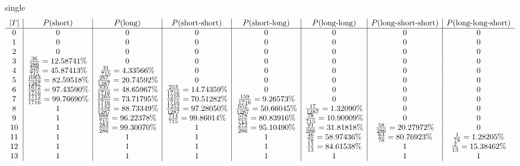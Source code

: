 single
\[
\begin{array}{c| c| c| c| c| c| c| c}
|T| & P(\text{short}) & P(\text{long}) & P(\text{short-short}) & P(\text{short-long}) & P(\text{long-long}) & P(\text{long-short-short}) & P(\text{long-long-short}) \\\hline
0 & 0 & 0 & 0 & 0 & 0 & 0 & 0\\
1 & 0 & 0 & 0 & 0 & 0 & 0 & 0\\
2 & 0 & 0 & 0 & 0 & 0 & 0 & 0\\
3 & \frac{36}{286} = 12.58741\% & 0 & 0 & 0 & 0 & 0 & 0\\
4 & \frac{328}{715} = 45.87413\% & \frac{31}{715} = 4.33566\% & 0 & 0 & 0 & 0 & 0\\
5 & \frac{1063}{1287} = 82.59518\% & \frac{267}{1287} = 20.74592\% & 0 & 0 & 0 & 0 & 0\\
6 & \frac{1672}{1716} = 97.43590\% & \frac{835}{1716} = 48.65967\% & \frac{253}{1716} = 14.74359\% & 0 & 0 & 0 & 0\\
7 & \frac{1712}{1716} = 99.76690\% & \frac{1265}{1716} = 73.71795\% & \frac{1210}{1716} = 70.51282\% & \frac{159}{1716} = 9.26573\% & 0 & 0 & 0\\
8 & 1 & \frac{1142}{1287} = 88.73349\% & \frac{1252}{1287} = 97.28050\% & \frac{652}{1287} = 50.66045\% & \frac{17}{1287} = 1.32090\% & 0 & 0\\
9 & 1 & \frac{688}{715} = 96.22378\% & \frac{714}{715} = 99.86014\% & \frac{578}{715} = 80.83916\% & \frac{78}{715} = 10.90909\% & 0 & 0\\
10 & 1 & \frac{284}{286} = 99.30070\% & 1 & \frac{272}{286} = 95.10490\% & \frac{91}{286} = 31.81818\% & \frac{58}{286} = 20.27972\% & 0\\
11 & 1 & 1 & 1 & 1 & \frac{46}{78} = 58.97436\% & \frac{63}{78} = 80.76923\% & \frac{1}{78} = 1.28205\%\\
12 & 1 & 1 & 1 & 1 & \frac{11}{13} = 84.61538\% & 1 & \frac{2}{13} = 15.38462\%\\
13 & 1 & 1 & 1 & 1 & 1 & 1 & 1\\
\end{array}
\]
